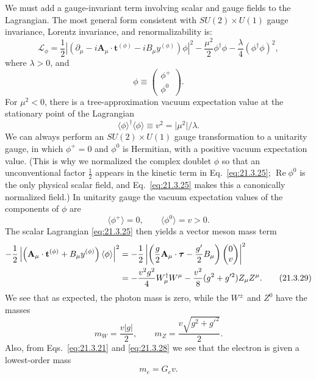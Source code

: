 We must add a gauge-invariant term involving scalar and gauge fields to the Lagrangian. The most general form consistent with $SU(2)\times U(1)$ gauge invariance, Lorentz invariance, and renormalizability is:
\begin{equation}
\mathcal{L}_\phi
=\frac{1}{2}\left|
\left(\partial_\mu-i\mathbf{A}_\mu\cdot\mathbf{t}^{(\phi)}
-iB_\mu y^{(\phi)}\right)\phi
\right|^2
-\frac{\mu^2}{2}\phi^\dagger\phi
-\frac{\lambda}{4}(\phi^\dagger\phi)^2,
\tag{21.3.25}\label{eq:21.3.25}
\end{equation}
where $\lambda>0$, and
\begin{equation}
\phi\equiv\begin{pmatrix}\phi^+\\\phi^0\end{pmatrix}.
\tag{21.3.26}\label{eq:21.3.26}
\end{equation}
For $\mu^2<0$, there is a tree-approximation vacuum expectation value at the stationary point of the Lagrangian
\begin{equation}
\langle\phi\rangle^\dagger\langle\phi\rangle
\equiv v^2=\lvert\mu^2\rvert/\lambda.
\tag{21.3.27}\label{eq:21.3.27}
\end{equation}
We can always perform an $SU(2)\times U(1)$ gauge transformation to a unitarity gauge, in which $\phi^+=0$ and $\phi^0$ is Hermitian, with a positive vacuum expectation value. (This is why we normalized the complex doublet $\phi$ so that an unconventional factor $\tfrac12$ appears in the kinetic term in Eq.~\eqref{eq:21.3.25}; $\operatorname{Re}\phi^0$ is the only physical scalar field, and Eq.~\eqref{eq:21.3.25} makes this a canonically normalized field.) In unitarity gauge the vacuum expectation values of the components of $\phi$ are
\begin{equation}
\langle\phi^+\rangle=0,
\qquad
\langle\phi^0\rangle=v>0.
\tag{21.3.28}\label{eq:21.3.28}
\end{equation}
The scalar Lagrangian \eqref{eq:21.3.25} then yields a vector meson mass term
\begin{align}
-\frac{1}{2}
\left|
\left(\mathbf{A}_\mu\cdot\mathbf{t}^{(\phi)}
+B_\mu y^{(\phi)}\right)\langle\phi\rangle
\right|^2
&=-\frac{1}{2}
\left|
\left(\frac{g}{2}\mathbf{A}_\mu\cdot\boldsymbol{\tau}-\frac{g'}{2}B_\mu\right)
\begin{pmatrix}0\\v\end{pmatrix}
\right|^2
\notag\\
&=-\frac{v^2g^2}{4}W_\mu^\dagger W^\mu
-\frac{v^2}{8}(g^2+g'^2)Z_\mu Z^\mu.
\tag{21.3.29}\label{eq:21.3.29}
\end{align}
We see that as expected, the photon mass is zero, while the $W^\pm$ and $Z^0$ have the masses
\begin{equation}
m_W=\frac{v\lvert g\rvert}{2},
\qquad
m_Z=\frac{v\sqrt{g^2+g'^2}}{2}.
\tag{21.3.30}\label{eq:21.3.30}
\end{equation}
Also, from Eqs.~\eqref{eq:21.3.21} and \eqref{eq:21.3.28} we see that the electron is given a lowest-order mass
\begin{equation}
m_e=G_ev.
\tag{21.3.31}\label{eq:21.3.31}
\end{equation}

